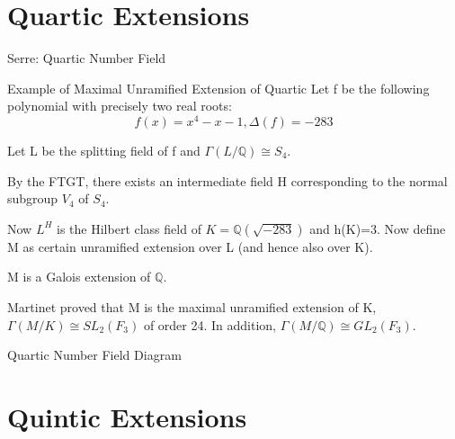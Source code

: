 \documentclass[10pt]{beamer}
\theoremstyle{plain} %
\begin{document}
\section{Quartic Extensions}
\begin{frame}{Serre: Quartic Number Field}
\pause

\begin{block}{Example of Maximal Unramified Extension of Quartic }
Let f be the following polynomial with precisely two real roots: \begin{equation}
    f(x)=x^4-x-1, \Delta(f)=-283
\end{equation}
\pause

Let  L be the splitting field of f and $\Gamma(L/\mathbb{Q})\cong S_4$.\par
By the FTGT, there exists an intermediate field H corresponding to the normal subgroup $V_4$ of $S_4$. \par 
Now $L^H$ is the Hilbert class field of $K= \mathbb{Q}(\sqrt{-283})$ and h(K)=3. Now define M as certain unramified extension over L (and hence also over K).
\pause

\par M is a Galois extension of $\mathbb{Q}$. 
\pause

\par Martinet proved that M is the maximal unramified extension of K, $\Gamma(M/K)\cong SL_2(F_3)$ of order 24. In addition, $\Gamma(M/\mathbb{Q})\cong GL_2(F_3)$. 
\end{block}
\end{frame}
\begin{frame}{Quartic Number Field Diagram}
  \begin{center}
\end{center}  
\end{frame}
\section{Quintic Extensions}
\end{document}
